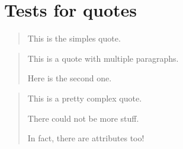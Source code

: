 \documentclass{Metanorma}
\begin{document}
  \section{Tests for quotes}

  \begin{quote}
    This is the simples quote.
  \end{quote}

  \begin{quote}
    This is a quote with multiple paragraphs.

    Here is the second one.
  \end{quote}

  \begin{quote}
    This is a pretty complex quote.

    There could not be more stuff.

    In fact, there are attributes too!
  \end{quote}


















\end{document}
